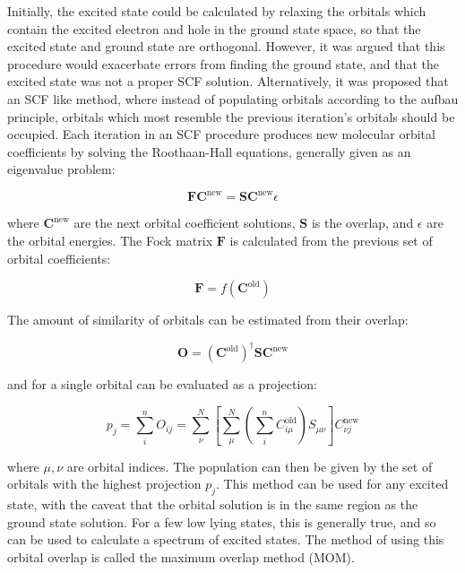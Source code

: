 Initially, the excited state could be calculated by relaxing the orbitals which
contain the excited electron and hole in the ground state space, so that the
excited state and ground state are orthogonal\cite{Hunt1969}. However, it was
argued that this procedure would exacerbate errors from finding the ground
state, and that the excited state was not a proper SCF solution\cite{Gilbert2008}.
Alternatively, it was proposed that an SCF like method, where instead of
populating orbitals according to the aufbau principle, orbitals which most
resemble the previous iteration's orbitals should be occupied. Each iteration 
in an SCF procedure produces new molecular orbital coefficients by solving the 
Roothaan-Hall equations\cite{Roothaan1951}, generally given as an eigenvalue problem:

\begin{equation}
\mathbf{F} \mathbf{C}^{\text{new}} = \mathbf{S} \mathbf{C}^{\text{new}} \epsilon
\end{equation}

where $\mathbf{C}^{\text{new}}$ are the next orbital coefficient solutions, 
$\mathbf{S}$ is the overlap, and $\epsilon$ are the orbital energies. 
The Fock matrix $\mathbf{F}$ is calculated from the previous set of orbital 
coefficients:

\begin{equation}
\mathbf{F} = f\left(\mathbf{C}^{\text{old}}\right)
\end{equation}

The amount of similarity of orbitals can be estimated from their overlap:

\begin{equation}
\mathbf{O} = \left(\mathbf{C}^{\text{old}}\right)^\dagger \mathbf{S} \mathbf{C}^{\text{new}}
\end{equation}

and for a single orbital can be evaluated as a projection:

\begin{equation}
p_j = \sum^n_i O_{ij} = \sum^N_\nu \left[\sum^N_\mu\left(\sum^n_i C_{i\mu}^{\text{old}}\right)S_{\mu\nu}\right]C^{\text{new}}_{\nu j}
\end{equation}

where $\mu,\nu$ are orbital indices. The population can then be given by the set
of orbitals with the highest projection $p_j$.  This method can be used for any
excited state, with the caveat that the orbital solution is in the same region
as the ground state solution. For a few low lying states, this is generally 
true, and so \dscf can be used to calculate a spectrum of excited states\cite{Gilbert2008}.
The method of using this orbital overlap is called the maximum overlap method (MOM).

